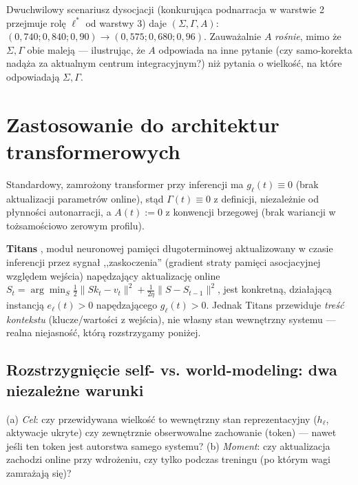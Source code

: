 \documentclass[11pt]{article}
\begin{document}
Dwuchwilowy scenariusz dysocjacji (konkurująca podnarracja w warstwie 2 przejmuje rolę $\ell^*$ od warstwy 3) daje $(\Sigma,\Gamma,A)$: $(0{,}740;0{,}840;0{,}90)\to(0{,}575;0{,}680;0{,}96)$. Zauważalnie $A$ \emph{rośnie}, mimo że $\Sigma,\Gamma$ obie maleją --- ilustrując, że $A$ odpowiada na inne pytanie (czy samo-korekta nadąża za aktualnym centrum integracyjnym?) niż pytania o wielkość, na które odpowiadają $\Sigma,\Gamma$.

\section{Zastosowanie do architektur transformerowych}

Standardowy, zamrożony transformer przy inferencji ma $g_\ell(t)\equiv0$ (brak aktualizacji parametrów online), stąd $\Gamma(t)\equiv0$ z definicji, niezależnie od płynności autonarracji, a $A(t):=0$ z konwencji brzegowej (brak wariancji w tożsamościowo zerowym profilu).

\textbf{Titans} \cite{behrouz2024}, moduł neuronowej pamięci długoterminowej aktualizowany w czasie inferencji przez sygnał ,,zaskoczenia'' (gradient straty pamięci asocjacyjnej względem wejścia) napędzający aktualizację online $S_t=\arg\min_S\frac12\|Sk_t-v_t\|^2+\frac1{2\eta}\|S-S_{t-1}\|^2$, jest konkretną, działającą instancją $e_\ell(t)>0$ napędzającego $g_\ell(t)>0$. Jednak Titans przewiduje \emph{treść kontekstu} (klucze/wartości z wejścia), nie własny stan wewnętrzny systemu --- realna niejasność, którą rozstrzygamy poniżej.

\subsection*{Rozstrzygnięcie self- vs. world-modeling: dwa niezależne warunki}
(a) \emph{Cel}: czy przewidywana wielkość to wewnętrzny stan reprezentacyjny ($h_\ell$, aktywacje ukryte) czy zewnętrznie obserwowalne zachowanie (token) --- nawet jeśli ten token jest autorstwa samego systemu? (b) \emph{Moment}: czy aktualizacja zachodzi online przy wdrożeniu, czy tylko podczas treningu (po którym wagi zamrażają się)?
\end{document}
